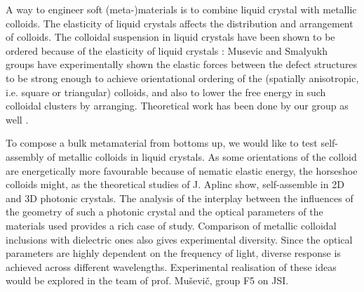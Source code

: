 \documentclass[a4paper,11pt]{article}
\begin{document}


A way to engineer soft (meta-)materials is to combine liquid crystal with metallic colloids. 
The elasticity of liquid crystals affects the distribution and arrangement of colloids. 
The colloidal suspension in liquid crystals have been shown to be ordered because of the elasticity of liquid crystals \cite{1, 2, 3,}: 
Musevic and Smalyukh groups have experimentally shown the elastic forces between the defect structures to be strong enough to achieve orientational ordering of the (spatially anisotropic, i.e. square or triangular) colloids, and also to lower the free energy in such colloidal clusters by arranging. 
Theoretical work has been done by our group as well \cite{cc}. 

To compose a bulk metamaterial from bottoms up, we would like to test self-assembly of metallic colloids in liquid crystals.
As some orientations of the colloid are energetically more favourable because of nematic elastic energy, the horseshoe colloids might, as the theoretical studies of J. Aplinc \cite{jure-HS} show, self-assemble in 2D and 3D photonic crystals. 
The analysis of the interplay between the influences of the geometry of such a photonic crystal and the optical parameters of the materials used provides a rich case of study. 
Comparison of metallic colloidal inclusions with dielectric ones also gives experimental diversity. 
Since the optical parameters are highly dependent on the frequency of light, diverse response is achieved across different wavelengths. 
Experimental realisation of these ideas would be explored in the team of prof. Muševič, group F5 on JSI. 

\end{document}
